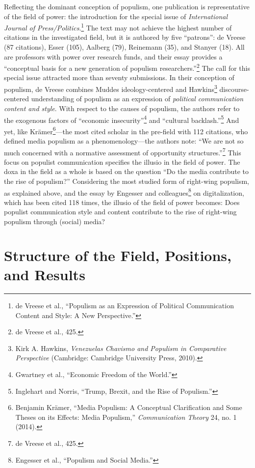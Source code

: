 \documentclass{tufte-handout}
\begin{document}
Reflecting the dominant conception of populism, one publication is
representative of the field of power: the introduction for the special
issue of \emph{International Journal of Press/Politics}.\footnote{de
  Vreese et al., ``Populism as an Expression of Political Communication
  Content and Style: A New Perspective.''} The text may not achieve the
highest number of citations in the investigated field, but it is
authored by five ``patrons'': de Vreese (87 citations), Esser (105),
Aalberg (79), Reinemann (35), and Stanyer (18). All are professors with
power over research funds, and their essay provides a ``conceptual basis
for a new generation of populism researchers.''\footnote{de Vreese et
  al., 425.} The call for this special issue attracted more than seventy
submissions. In their conception of populism, de Vreese combines
Mudde\textquotesingle s ideology-centered and
Hawkin\textquotesingle s\footnote{Kirk A. Hawkins,
  \emph{Venezuela\textquotesingle s Chavismo and Populism in Comparative
  Perspective} (Cambridge: Cambridge University Press, 2010).}
discourse-centered understanding of populism as an expression of
\emph{political communication content and style}. With respect to the
causes of populism, the authors refer to the exogenous factors of
``economic insecurity''\footnote{Gwartney et al., ``Economic Freedom of
  the World.''} and ``cultural backlash.''\footnote{Inglehart and Norris,
  ``Trump, Brexit, and the Rise of Populism.''} And yet, like
Krämer\footnote{Benjamin Krämer, ``Media Populism: A Conceptual
  Clarification and Some Theses on its Effects: Media Populism,''
  \emph{Communication Theory} 24, no. 1 (2014).}---the most cited
scholar in the pre-field with 112 citations, who defined media populism
as a phenomenology---the authors note: ``We are not so much concerned
with a normative assessment of opportunity structures.''\footnote{de
  Vreese et al., 425.} This focus on populist communication specifies
the illusio in the field of power. The doxa in the field as a whole is
based on the question ``Do the media contribute to the rise of
populism?'' Considering the most studied form of right-wing populism, as
explained above, and the essay by Engesser and colleagues\footnote{Engesser
  et al., ``Populism and Social Media.''} on digitalization, which has
been cited 118 times, the illusio of the field of power becomes: Does
populist communication style and content contribute to the rise of
right-wing populism through (social) media?

\hypertarget{structure-of-the-field-positions-and-results}{%
\section{\texorpdfstring{Structure of the Field, Positions, and
Results
}{Structure of the Field, Positions, and Results }}\label{structure-of-the-field-positions-and-results}}
\end{document}
